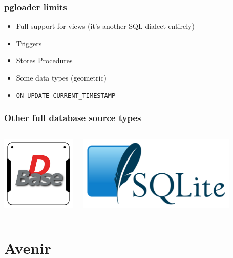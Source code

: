\documentclass{beamer}
\begin{document}
\begin{frame}[fragile]
  \frametitle{pgloader limits}
  
  \vfill

  \begin{itemize}
  \item Full support for views (it's another SQL dialect entirely)
  \item Triggers
  \item Stores Procedures
  \item Some data types (geometric)
  \item \texttt{ON UPDATE CURRENT\_TIMESTAMP}
  \end{itemize}  
\end{frame}


\begin{frame}
  \frametitle{Other full database source types}

  \begin{columns}[c]
    \begin{center}
      \includegraphics[height=1.4in]{dBase.png}
    \end{center}

    \begin{center}
      \includegraphics[height=1.4in]{SQLite.png}
    \end{center}
  \end{columns}
\end{frame}

\section{Avenir}
\end{document}
